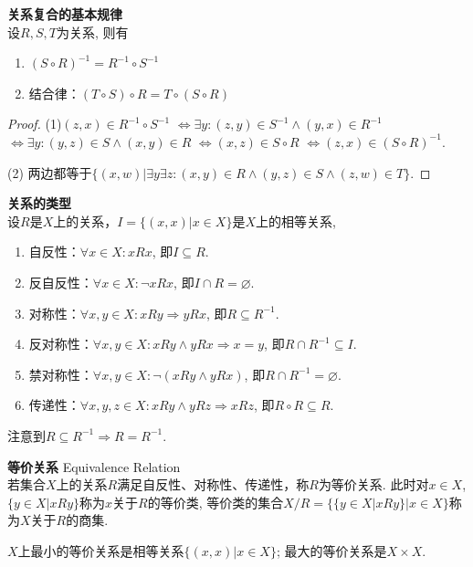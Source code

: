 \begin{pro}\textbf{关系复合的基本规律}\\
设$R,S,T$为关系, 则有
\begin{enumerate}
\item $(S\circ R)^{-1}=R^{-1}\circ S^{-1}$
\item 结合律：$(T\circ S)\circ R= T\circ (S\circ R)$
\end{enumerate}
\end{pro}
\begin{proof}
(1)$(z,x)\in R^{-1}\circ S^{-1} $
$\Leftrightarrow \exists y: (z,y)\in S^{-1}\land (y,x)\in R^{-1}$
$\Leftrightarrow \exists y: (y,z)\in S \land (x,y)\in R$
$\Leftrightarrow (x,z)\in S\circ R$
$\Leftrightarrow (z,x)\in (S\circ R)^{-1}$. 
\par (2) 两边都等于$\{(x,w)\vert \exists y\exists z: (x,y)\in R \land (y,z)\in S \land (z,w)\in T\}$. 
\end{proof}

\begin{dfn} \textbf{关系的类型}\\
设$R$是$X$上的关系，$I=\{(x,x)\vert x\in X\}$是$X$上的相等关系, 
\begin{enumerate}
    \item 自反性：$\forall x\in X: xRx$, 即$I\subseteq R$. 
    \item 反自反性：$\forall x\in X: \lnot xRx$, 即$I\cap R=\varnothing$.
    \item 对称性：$\forall x,y\in X: xRy\Rightarrow yRx$, 即$R\subseteq R^{-1}$. 
    \item 反对称性：$\forall x,y\in X: xRy\land yRx\Rightarrow x=y$, 即$R\cap  R^{-1}\subseteq I$.
    \item 禁对称性：$\forall x,y\in X: \lnot(xRy\land yRx)$, 即$R\cap  R^{-1}=\varnothing$.
    \item 传递性：$\forall x,y,z\in X: xRy \land yRz\Rightarrow xRz$, 即$R\circ R \subseteq R$.
\end{enumerate}
\end{dfn}
注意到$R\subseteq R^{-1}\Rightarrow R=R^{-1}$. 

\begin{dfn} \textbf{等价关系} Equivalence Relation\\
若集合$X$上的关系$R$满足自反性、对称性、传递性，称$R$为等价关系. 此时对$x\in X$, $\{y\in X\vert xRy\}$称为$x$关于$R$的等价类, 等价类的集合$X/R=\{\{y\in X\vert xRy\}\vert x\in X\}$称为$X$关于$R$的商集. 
\end{dfn}
$X$上最小的等价关系是相等关系$\{(x,x)\vert x\in X\}$; 最大的等价关系是$X\times X$.

